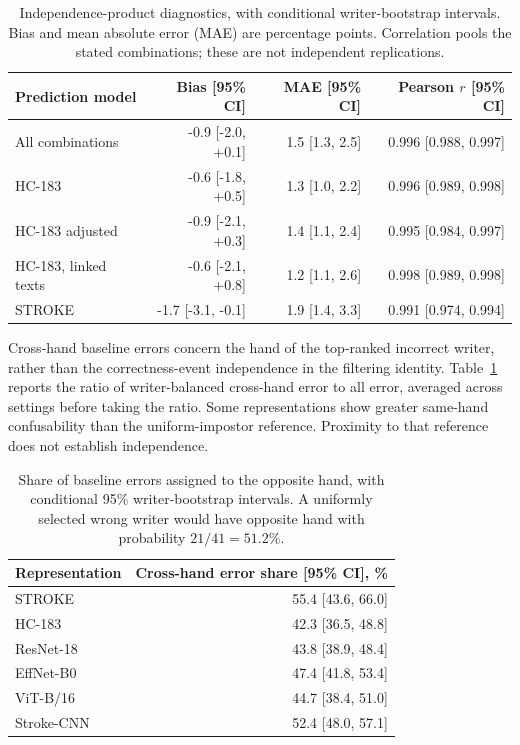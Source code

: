\documentclass[10pt,a4paper]{article}
\begin{document}
\begin{table}[ht]
\centering\small
\caption{Independence-product diagnostics, with conditional writer-bootstrap intervals. Bias and mean absolute error (MAE) are percentage points. Correlation pools the stated combinations; these are not independent replications.}
\begin{tabular}{lrrr}\toprule
Prediction model & Bias [95\% CI] & MAE [95\% CI] & Pearson $r$ [95\% CI]\\\midrule
All combinations & -0.9 [-2.0, +0.1] & 1.5 [1.3, 2.5] & 0.996 [0.988, 0.997] \\
HC-183 & -0.6 [-1.8, +0.5] & 1.3 [1.0, 2.2] & 0.996 [0.989, 0.998] \\
HC-183 adjusted & -0.9 [-2.1, +0.3] & 1.4 [1.1, 2.4] & 0.995 [0.984, 0.997] \\
HC-183, linked texts & -0.6 [-2.1, +0.8] & 1.2 [1.1, 2.6] & 0.998 [0.989, 0.998] \\
STROKE & -1.7 [-3.1, -0.1] & 1.9 [1.4, 3.3] & 0.991 [0.974, 0.994] \\
\bottomrule

\end{tabular}
\end{table}

Cross-hand baseline errors concern the hand of the top-ranked incorrect writer, rather than the correctness-event independence in the filtering identity. Table~\ref{tab:crosshand} reports the ratio of writer-balanced cross-hand error to all error, averaged across settings before taking the ratio. Some representations show greater same-hand confusability than the uniform-impostor reference. Proximity to that reference does not establish independence.

\begin{table}[ht]
\centering\small
\caption{Share of baseline errors assigned to the opposite hand, with conditional 95\% writer-bootstrap intervals. A uniformly selected wrong writer would have opposite hand with probability $21/41=51.2\%$.}\label{tab:crosshand}
\begin{tabular}{lr}\toprule
Representation & Cross-hand error share [95\% CI], \%\\\midrule
STROKE & 55.4 [43.6, 66.0] \\
HC-183 & 42.3 [36.5, 48.8] \\
ResNet-18 & 43.8 [38.9, 48.4] \\
EffNet-B0 & 47.4 [41.8, 53.4] \\
ViT-B/16 & 44.7 [38.4, 51.0] \\
Stroke-CNN & 52.4 [48.0, 57.1] \\
\bottomrule

\end{tabular}
\end{table}
\end{document}
